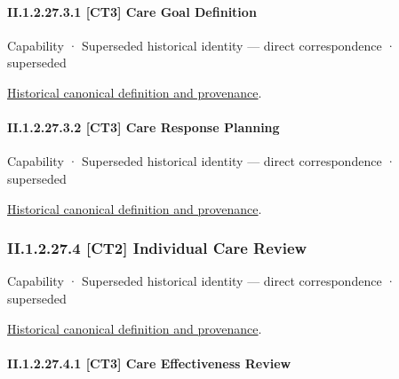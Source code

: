 \paragraph*{II.1.2.27.3.1 [CT3] Care Goal Definition}
\label{navigation:II.1.2.27.3.1}

\label{element:8bfbcc0a455d423c90ae2f1cfb732ca8}
{\small Capability · Superseded historical identity — direct correspondence · superseded}\par
\href{../../../../continuum/strategy/capability/8bfbcc0a455d423c90ae2f1cfb732ca8.md}{Historical canonical definition and provenance}.\par
\paragraph*{II.1.2.27.3.2 [CT3] Care Response Planning}
\label{navigation:II.1.2.27.3.2}

\label{element:d64569acaf2c44f3b2a5332f74fff7c7}
{\small Capability · Superseded historical identity — direct correspondence · superseded}\par
\href{../../../../continuum/strategy/capability/d64569acaf2c44f3b2a5332f74fff7c7.md}{Historical canonical definition and provenance}.\par
\subsubsection*{II.1.2.27.4 [CT2] Individual Care Review}
\label{navigation:II.1.2.27.4}

\label{element:e1048f6c635d4e16b5384cc2cb45a71b}
{\small Capability · Superseded historical identity — direct correspondence · superseded}\par
\href{../../../../continuum/strategy/capability/e1048f6c635d4e16b5384cc2cb45a71b.md}{Historical canonical definition and provenance}.\par
\paragraph*{II.1.2.27.4.1 [CT3] Care Effectiveness Review}
\label{navigation:II.1.2.27.4.1}

